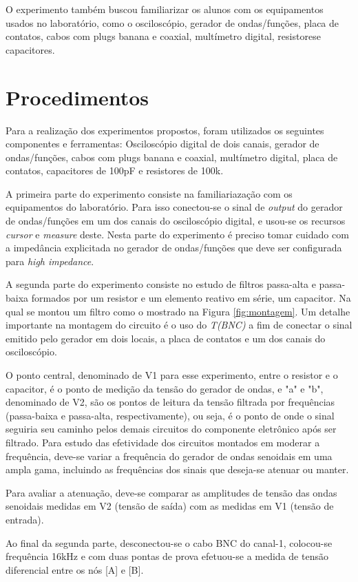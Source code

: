 \documentclass{article}
\begin{document}
O experimento também buscou familiarizar os alunos com os equipamentos usados no laboratório, como o osciloscópio, gerador de ondas/funções, placa de contatos, cabos com plugs banana e coaxial, multímetro digital, resistorese capacitores.

\section{Procedimentos}
Para a realização dos experimentos propostos, foram utilizados os seguintes componentes e ferramentas: Osciloscópio digital de dois canais, gerador de ondas/funções, cabos com plugs banana e coaxial, multímetro digital, placa de contatos, capacitores de 100pF e resistores de 100k\textOmega.

A primeira parte do experimento consiste na familiariazação com os equipamentos do laboratório. Para isso conectou-se o sinal de \emph{output} do gerador de ondas/funções em um dos canais do osciloscópio digital, e usou-se os recursos \emph{cursor} e \emph{measure} deste. Nesta parte do experimento é preciso tomar cuidado com a impedância explicitada no gerador de ondas/funções que deve ser configurada para \emph{high impedance}.

A segunda parte do experimento consiste no estudo de filtros passa-alta e passa-baixa formados por um resistor e um elemento reativo em série, um capacitor. Na qual se montou um filtro como o mostrado na Figura \ref{fig:montagem}. Um detalhe importante na montagem do circuito é o uso do \emph{T(BNC)} a fim de conectar o sinal emitido pelo gerador em dois locais, a placa de contatos e um dos canais do osciloscópio.

O ponto central, denominado de V1 para esse experimento, entre o resistor e o capacitor, é o ponto de medição da tensão do gerador de ondas, e "a" e "b", denominado de V2, são os pontos de leitura da tensão filtrada por frequências (passa-baixa e passa-alta, respectivamente), ou seja, é o ponto de onde o sinal seguiria seu caminho pelos demais circuitos do componente eletrônico após ser filtrado. Para estudo das efetividade dos circuitos montados em moderar a frequência, deve-se variar a frequência do gerador de ondas senoidais em uma ampla gama, incluindo as frequências dos sinais que deseja-se atenuar ou manter. 

Para avaliar a atenuação, deve-se comparar as amplitudes de tensão  das ondas senoidais medidas em V2 (tensão de saída) com as medidas em V1 (tensão de entrada).

Ao final da segunda parte, desconectou-se o cabo BNC do canal-1, colocou-se frequência 16kHz e com duas pontas de prova efetuou-se a medida de tensão diferencial entre os nós [A] e [B].
\end{document}
